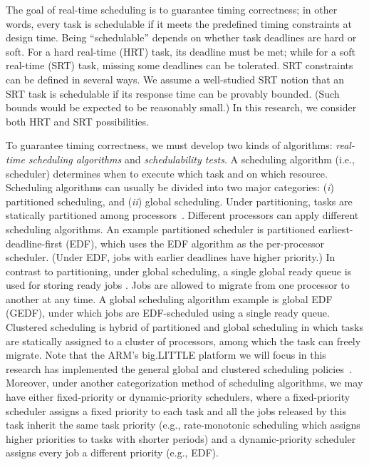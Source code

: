 The goal of real-time scheduling is to guarantee timing correctness; in other words, every task is schedulable if it meets the predefined timing constraints at design time. Being ``schedulable'' depends on whether task deadlines are hard or soft. %
For a hard real-time (HRT) task, its deadline must be met; while for a soft real-time (SRT) task, missing some deadlines can be tolerated. %
 SRT constraints can be defined in several ways. We assume a well-studied SRT notion \cite{mills2010stochastic, erickson2012soft, johndissertation, BBBdissertation, devidissertation, leontyevdissertation} that an SRT task is schedulable if its response time can be provably bounded. (Such bounds would be expected to be reasonably small.) In this research, we consider both HRT and SRT possibilities.  

To guarantee timing correctness, we must develop two kinds of algorithms: \textit{real-time scheduling algorithms} and \textit{schedulability tests}. A scheduling algorithm (i.e., scheduler) determines when to execute which task and on which resource. Scheduling algorithms can usually be divided into two major categories: (\textit{i}) partitioned scheduling, and (\textit{ii}) global scheduling. %
Under partitioning, tasks are statically partitioned among processors~\cite{andersson2003, baker2007, funk2005, Baruah2006a, chattopadhyay2011, baruah2005a}. %
Different processors can apply different scheduling algorithms. An example partitioned scheduler is partitioned earliest-deadline-first (EDF), which uses the EDF algorithm as the per-processor scheduler. (Under EDF, jobs with earlier deadlines have higher priority.) In contrast to partitioning, under global scheduling, a single global ready queue is used for storing ready jobs \cite{baruah2008, bertogna2011b, BC, devi2005}. Jobs are allowed to migrate from one processor to another at any time. A global scheduling algorithm example is global EDF (GEDF), under which jobs are EDF-scheduled using a single ready queue. 
 Clustered scheduling is hybrid of partitioned and global scheduling in which tasks are statically assigned to a cluster of processors, among which the task can freely migrate.
 Note that the ARM's big.LITTLE platform we will focus in this research has implemented the general global and clustered scheduling policies~\cite{armscheduler}. Moreover, under another categorization method of scheduling algorithms, we may have either fixed-priority or dynamic-priority schedulers, where a fixed-priority scheduler assigns a fixed priority to each task and all the jobs released by this task inherit the same task priority (e.g., rate-monotonic scheduling which assigns higher priorities to tasks with shorter periods) and a dynamic-priority scheduler assigns every job a different priority (e.g., EDF).
 
